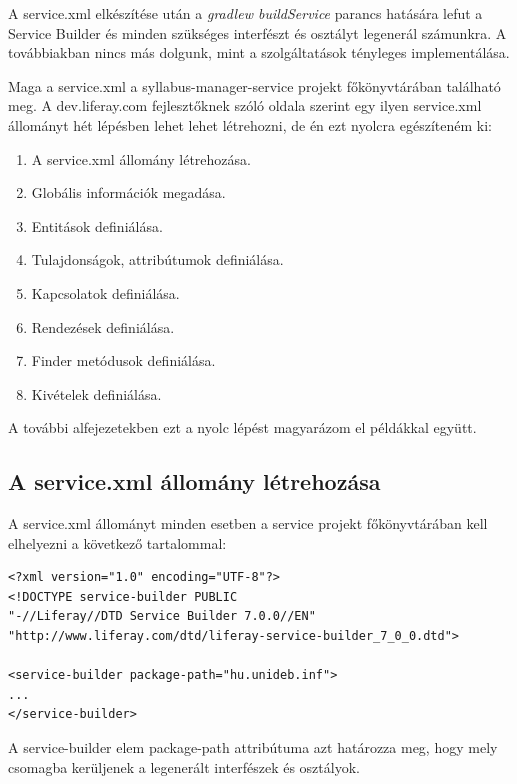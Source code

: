 \documentclass[hidelinks, 12pt, a4paper]{report}
\begin{document}
A service.xml elkészítése után a \emph{gradlew buildService} parancs hatására lefut a Service Builder és minden szükséges interfészt és osztályt legenerál számunkra. A továbbiakban nincs más dolgunk, mint a szolgáltatások tényleges implementálása.

Maga a service.xml a syllabus-manager-service projekt főkönyvtárában található meg. A dev.liferay.com fejlesztőknek szóló oldala szerint egy ilyen service.xml állományt hét lépésben lehet lehet létrehozni, de én ezt nyolcra egészíteném ki:
\begin{enumerate}
\item A service.xml állomány létrehozása.
\item Globális információk megadása.
\item Entitások definiálása.
\item Tulajdonságok, attribútumok definiálása.
\item Kapcsolatok definiálása.
\item Rendezések definiálása.
\item Finder metódusok definiálása.
\item Kivételek definiálása.
\end{enumerate}


A további alfejezetekben ezt a nyolc lépést magyarázom el példákkal együtt.

\subsection{A service.xml állomány létrehozása}

A service.xml állományt minden esetben a service projekt főkönyvtárában kell elhelyezni a következő tartalommal:

\begin{minipage}{\linewidth}
\begin{lstlisting}[basicstyle=\small]
<?xml version="1.0" encoding="UTF-8"?>
<!DOCTYPE service-builder PUBLIC
"-//Liferay//DTD Service Builder 7.0.0//EN"
"http://www.liferay.com/dtd/liferay-service-builder_7_0_0.dtd">

<service-builder package-path="hu.unideb.inf">
...
</service-builder>
\end{lstlisting}
\end{minipage}

A service-builder elem package-path attribútuma azt határozza meg, hogy mely csomagba kerüljenek a legenerált interfészek és osztályok.
\end{document}
